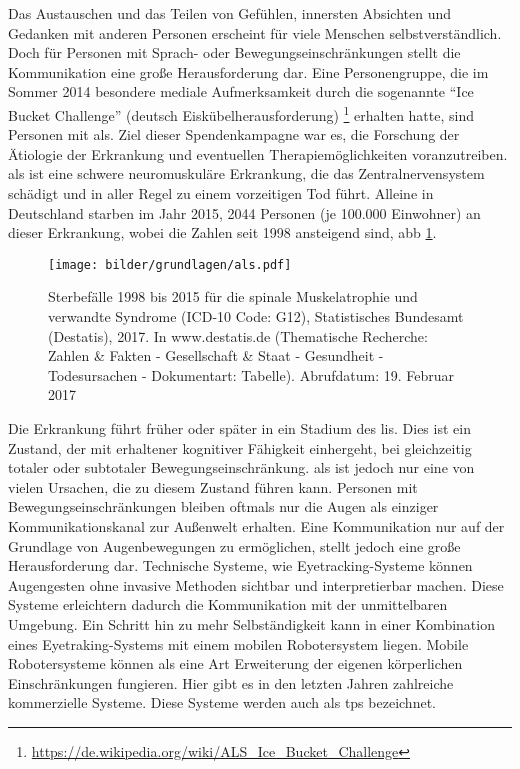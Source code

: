 
Das Austauschen und das Teilen von Gefühlen, innersten Absichten und Gedanken mit anderen Personen erscheint für viele Menschen selbstverständlich. Doch für Personen mit Sprach- oder Bewegungseinschränkungen stellt die Kommunikation eine große Herausforderung dar. Eine Personengruppe, die im Sommer 2014 besondere mediale Aufmerksamkeit durch die sogenannte \enquote{Ice Bucket Challenge} (deutsch Eiskübelherausforderung) \footnote{\url{https://de.wikipedia.org/wiki/ALS_Ice_Bucket_Challenge}} erhalten hatte, sind Personen mit \acf{als}. Ziel dieser Spendenkampagne war es, die Forschung \bzgl der Ätiologie der Erkrankung und eventuellen Therapiemöglichkeiten voranzutreiben. \acs{als} ist eine schwere neuromuskuläre Erkrankung, die das Zentralnervensystem schädigt und in aller Regel zu einem vorzeitigen Tod führt. Alleine in Deutschland starben im Jahr 2015, 2044 Personen (je 100.000 Einwohner) an dieser Erkrankung, wobei die Zahlen seit 1998 ansteigend sind, \vgl \acl{abb} \ref{fig:stat}.

\begin{figure}[ht]
   \begin{minipage}[t]{\linewidth} 
      \centering 
     \texttt{[image: bilder/grundlagen/als.pdf]}
   \end{minipage}%
   \caption{Sterbefälle 1998 bis 2015 für die spinale Muskelatrophie und verwandte Syndrome (ICD-10 Code: G12), Statistisches Bundesamt (Destatis), 2017. In www.destatis.de (Thematische Recherche: Zahlen \& Fakten - Gesellschaft \& Staat - Gesundheit - Todesursachen - Dokumentart: Tabelle). Abrufdatum: 19. Februar 2017 \protect\footnotemark }\label{fig:stat} 
\end{figure} 

Die Erkrankung führt früher oder später in ein Stadium des \acf{lis}. Dies ist ein Zustand, der mit erhaltener kognitiver Fähigkeit einhergeht, bei gleichzeitig totaler oder subtotaler Bewegungseinschränkung. \acs{als} ist jedoch nur eine von vielen Ursachen, die zu diesem Zustand führen kann. Personen mit Bewegungseinschränkungen bleiben oftmals nur die Augen als einziger Kommunikationskanal zur Außenwelt erhalten. Eine Kommunikation nur auf der Grundlage von Augenbewegungen zu ermöglichen, stellt jedoch eine große Herausforderung dar. Technische Systeme, wie Eyetracking-Systeme können Augengesten ohne invasive Methoden sichtbar und interpretierbar machen. Diese Systeme erleichtern dadurch die Kommunikation mit der unmittelbaren Umgebung. Ein Schritt hin zu mehr Selbständigkeit kann in einer Kombination eines Eyetraking-Systems mit einem mobilen Robotersystem liegen. 
Mobile Robotersysteme können als eine Art Erweiterung der eigenen körperlichen Einschränkungen fungieren. Hier gibt es in den letzten Jahren zahlreiche kommerzielle Systeme.  Diese Systeme werden auch als \acf{tps} bezeichnet. 

